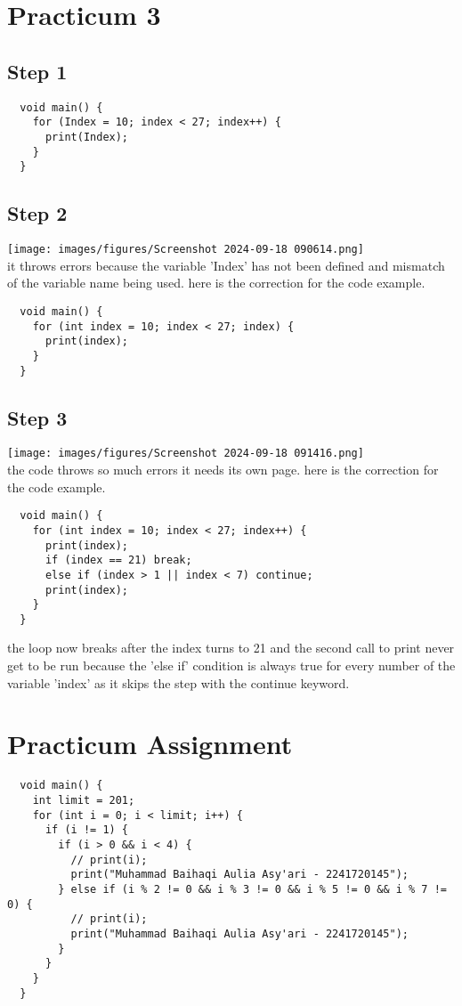 \documentclass[12pt,titlepage]{article}
\begin{document}
\newpage

\section*{Practicum 3}
\subsection*{Step 1}
\begin{verbatim}
  void main() {
    for (Index = 10; index < 27; index++) {
      print(Index);
    }
  }
\end{verbatim}

\subsection*{Step 2}
\texttt{[image: images/figures/Screenshot 2024-09-18 090614.png]} \\
it throws errors because the variable 'Index' has not been defined and mismatch of the variable name being used. here is the correction for the code example.
\begin{verbatim}
  void main() {
    for (int index = 10; index < 27; index) {
      print(index);
    }
  }
\end{verbatim}
\subsection*{Step 3}
\texttt{[image: images/figures/Screenshot 2024-09-18 091416.png]} \\
the code throws so much errors it needs its own page. here is the correction for the code example.
\begin{verbatim}
  void main() {
    for (int index = 10; index < 27; index++) {
      print(index);
      if (index == 21) break;
      else if (index > 1 || index < 7) continue;
      print(index);
    }
  }
\end{verbatim}
the loop now breaks after the index turns to 21 and the second call to print never get to be run because the 'else if' condition is always true for every number of the variable 'index' as it skips the step with the continue keyword.

\newpage

\section*{Practicum Assignment}
\begin{verbatim}
  void main() {
    int limit = 201;
    for (int i = 0; i < limit; i++) {
      if (i != 1) {
        if (i > 0 && i < 4) {
          // print(i);
          print("Muhammad Baihaqi Aulia Asy'ari - 2241720145");
        } else if (i % 2 != 0 && i % 3 != 0 && i % 5 != 0 && i % 7 != 0) {
          // print(i);
          print("Muhammad Baihaqi Aulia Asy'ari - 2241720145");
        }
      }
    }
  }
\end{verbatim}
\end{document}
